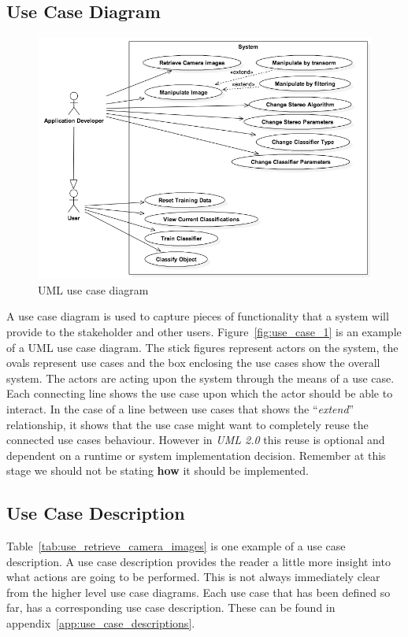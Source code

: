 \documentclass[11pt,oneside]{report}
\begin{document}
			\subsection{Use Case Diagram}
			
			\begin{figure}[ht]
			\begin{center}
    				\includegraphics[scale=0.45]{use_case_2}
    			\caption{UML use case diagram \protect {\label{fig:use_case_1}}}
    			\end{center}
			\end{figure}	
			A use case diagram is used to capture pieces of functionality that a system will provide to the stakeholder and other users.
			Figure~\ref{fig:use_case_1} is an example of a UML use case diagram.
			The stick figures represent actors on the system, the ovals represent use cases and the box enclosing the use cases show the overall system. 
			The actors are acting upon the system through the means of a use case.
			Each connecting line shows the use case upon which the actor should be able to interact.
			In the case of a line between use cases that shows the ``\textit{extend}'' relationship, it shows that the use case might want to completely reuse the connected use cases behaviour.
			However in \textit{UML 2.0} this reuse is optional and dependent on a runtime or system implementation decision.
			Remember at this stage we should not be stating \textbf{how} it should be implemented.
			\subsection{Use Case Description}
			Table~\ref{tab:use_retrieve_camera_images} is one example of a use case description.
			A use case description provides the reader a little more insight into what actions are going to be performed.
			This is not always immediately clear from the higher level use case diagrams.
			Each use case that has been defined so far, has a corresponding use case description.
			These can be found in appendix~\ref{app:use_case_descriptions}.
			
		\clearpage
\end{document}
